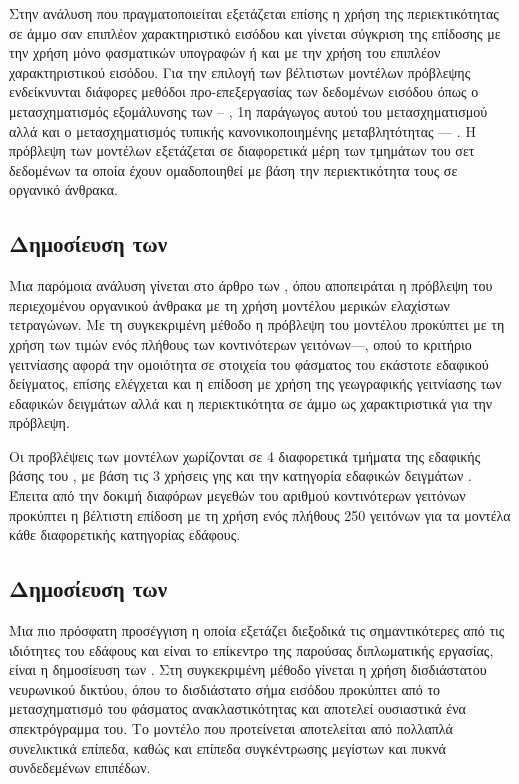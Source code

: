 Στην ανάλυση που πραγματοποιείται εξετάζεται επίσης η χρήση της περιεκτικότητας σε άμμο σαν επιπλέον χαρακτηριστικό εισόδου και γίνεται σύγκριση της επίδοσης με την χρήση μόνο φασματικών υπογραφών ή και με την χρήση του επιπλέον χαρακτηριστικού εισόδου. Για την επιλογή των βέλτιστων μοντέλων πρόβλεψης ενδείκνυνται διάφορες μεθόδοι προ-επεξεργασίας των δεδομένων εισόδου όπως ο μετασχηματισμός εξομάλυνσης των -- \cite{savitzky_golay}, 1η παράγωγος αυτού του μετασχηματισμού αλλά και ο μετασχηματισμός τυπικής κανονικοποιημένης μεταβλητότητας --- . Η πρόβλεψη των μοντέλων εξετάζεται σε διαφορετικά μέρη των τμημάτων του σετ δεδομένων τα οποία έχουν ομαδοποιηθεί με βάση την περιεκτικότητα τους σε οργανικό άνθρακα.

\subsection{Δημοσίευση των }
Μια παρόμοια ανάλυση γίνεται στο άρθρο των  \cite{nocita_lucas_soil}, όπου αποπειράται η πρόβλεψη του περιεχομένου οργανικού άνθρακα με τη χρήση μοντέλου μερικών ελαχίστων τετραγώνων. Με τη συγκεκριμένη μέθοδο η πρόβλεψη του μοντέλου προκύπτει με τη χρήση των τιμών ενός πλήθους των κοντινότερων γειτόνων---, οπού το κριτήριο γειτνίασης αφορά την ομοιότητα σε στοιχεία του φάσματος του εκάστοτε εδαφικού δείγματος, επίσης ελέγχεται και η επίδοση με χρήση της γεωγραφικής γειτνίασης των εδαφικών δειγμάτων αλλά και η περιεκτικότητα σε άμμο ως χαρακτιριστικά για την πρόβλεψη.

Οι προβλέψεις των μοντέλων χωρίζονται σε 4 διαφορετικά τμήματα της εδαφικής βάσης του , με βάση τις 3 χρήσεις γης  και την κατηγορία εδαφικών δειγμάτων . Έπειτα από την δοκιμή διαφόρων μεγεθών του αριθμού κοντινότερων γειτόνων προκύπτει η βέλτιστη επίδοση με τη χρήση ενός πλήθους 250 γειτόνων για τα μοντέλα κάθε διαφορετικής κατηγορίας εδάφους.

\subsection{Δημοσίευση των }
Μια πιο πρόσφατη προσέγγιση η οποία εξετάζει διεξοδικά τις σημαντικότερες από τις ιδιότητες του εδάφους και είναι το επίκεντρο της παρούσας διπλωματικής εργασίας, είναι η δημοσίευση των  \cite{padarian_lucas_soil}. Στη συγκεκριμένη μέθοδο γίνεται η χρήση δισδιάστατου νευρωνικού δικτύου, όπου το δισδιάστατο σήμα εισόδου προκύπτει από το μετασχηματισμό  του φάσματος ανακλαστικότητας και αποτελεί ουσιαστικά ένα σπεκτρόγραμμα του. Το μοντέλο που προτείνεται αποτελείται από πολλαπλά συνελικτικά επίπεδα, καθώς και επίπεδα συγκέντρωσης μεγίστων και πυκνά συνδεδεμένων επιπέδων.

